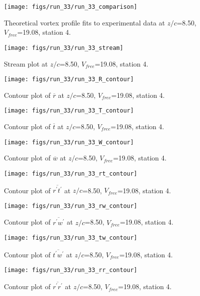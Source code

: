 \begin{figure}[H]
\centering
\texttt{[image: figs/run\_33/run\_33\_comparison]}
\caption{Theoretical vortex profile fits to experimental data at $z/c$=8.50, $V_{free}$=19.08, station 4.}
\end{figure}


\begin{figure}[H]
\centering
\texttt{[image: figs/run\_33/run\_33\_stream]}
\caption{Stream plot at $z/c$=8.50, $V_{free}$=19.08, station 4.}
\end{figure}


\begin{figure}[H]
\centering
\texttt{[image: figs/run\_33/run\_33\_R\_contour]}
\caption{Contour plot of $\overline{r}$ at $z/c$=8.50, $V_{free}$=19.08, station 4.}
\end{figure}


\begin{figure}[H]
\centering
\texttt{[image: figs/run\_33/run\_33\_T\_contour]}
\caption{Contour plot of $\overline{t}$ at $z/c$=8.50, $V_{free}$=19.08, station 4.}
\end{figure}


\begin{figure}[H]
\centering
\texttt{[image: figs/run\_33/run\_33\_W\_contour]}
\caption{Contour plot of $\overline{w}$ at $z/c$=8.50, $V_{free}$=19.08, station 4.}
\end{figure}


\begin{figure}[H]
\centering
\texttt{[image: figs/run\_33/run\_33\_rt\_contour]}
\caption{Contour plot of $\overline{r^\prime t^\prime}$ at $z/c$=8.50, $V_{free}$=19.08, station 4.}
\end{figure}


\begin{figure}[H]
\centering
\texttt{[image: figs/run\_33/run\_33\_rw\_contour]}
\caption{Contour plot of $\overline{r^\prime w^\prime}$ at $z/c$=8.50, $V_{free}$=19.08, station 4.}
\end{figure}


\begin{figure}[H]
\centering
\texttt{[image: figs/run\_33/run\_33\_tw\_contour]}
\caption{Contour plot of $\overline{t^\prime w^\prime}$ at $z/c$=8.50, $V_{free}$=19.08, station 4.}
\end{figure}


\begin{figure}[H]
\centering
\texttt{[image: figs/run\_33/run\_33\_rr\_contour]}
\caption{Contour plot of $\overline{r^\prime r^\prime}$ at $z/c$=8.50, $V_{free}$=19.08, station 4.}
\end{figure}


